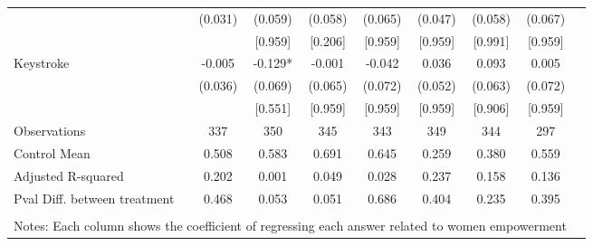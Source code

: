\begin{tabular}{l*{8}{c}}
                    &     (0.031)   &     (0.059)   &     (0.058)   &     (0.065)   &     (0.047)   &     (0.058)   &     (0.067)   \\
                    &               &     [0.959]   &     [0.206]   &     [0.959]   &     [0.959]   &     [0.991]   &     [0.959]   \\
Keystroke           &      -0.005   &      -0.129*  &      -0.001   &      -0.042   &       0.036   &       0.093   &       0.005   \\
                    &     (0.036)   &     (0.069)   &     (0.065)   &     (0.072)   &     (0.052)   &     (0.063)   &     (0.072)   \\
                    &               &     [0.551]   &     [0.959]   &     [0.959]   &     [0.959]   &     [0.906]   &     [0.959]   \\
\hline
Observations        &         337   &         350   &         345   &         343   &         349   &         344   &         297   \\
Control Mean        &       0.508   &       0.583   &       0.691   &       0.645   &       0.259   &       0.380   &       0.559   \\
Adjusted R-squared  &       0.202   &       0.001   &       0.049   &       0.028   &       0.237   &       0.158   &       0.136   \\
Pval Diff. between treatment&       0.468   &       0.053   &       0.051   &       0.686   &       0.404   &       0.235   &       0.395   \\
\hline \\ \multicolumn{8}{l}{\tiny Notes: Each column shows the coefficient of regressing each answer related to women empowerment
}
\end{tabular}
